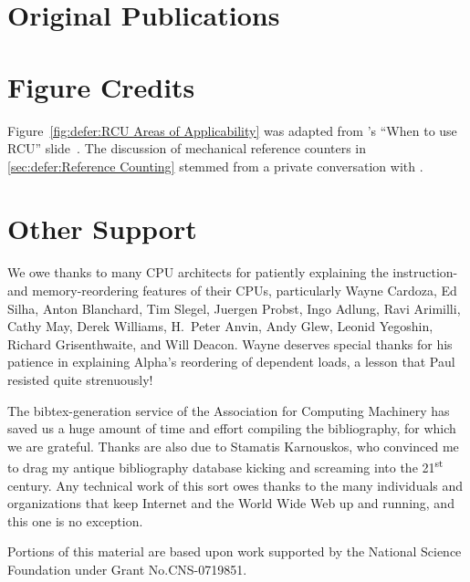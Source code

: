 \section{Original Publications}

\ListOriginalPublications

\section{Figure Credits}

\ListContributions

Figure~\ref{fig:defer:RCU Areas of Applicability} was adapted from
's ``When to use RCU'' slide~\cite{FedorPikus2017RCUthenWhat}.
The discussion of mechanical reference counters in
\cref{sec:defer:Reference Counting}
stemmed from a private conversation with .

\section{Other Support}

We owe thanks to many CPU architects for patiently explaining the
instruction- and memory-reordering features of their CPUs, particularly
Wayne Cardoza, Ed Silha, Anton Blanchard, Tim Slegel, Juergen Probst,
Ingo Adlung, Ravi Arimilli, Cathy May, Derek Williams,
H.~Peter Anvin,
Andy Glew, Leonid Yegoshin,
Richard Grisenthwaite, and Will Deacon.
Wayne deserves special thanks for his patience in explaining Alpha's reordering
of dependent loads, a lesson that Paul resisted quite strenuously!

The bibtex-generation service of the Association for Computing Machinery
has saved us a huge amount of time and effort compiling the bibliography,
for which we are grateful.
Thanks are also due to Stamatis Karnouskos, who convinced me to drag my
antique bibliography database kicking and screaming into the
21\textsuperscript{st} century.
Any technical work of this sort owes thanks to the many individuals and
organizations that keep Internet and the World Wide Web up and running,
and this one is no exception.

Portions of this material are based upon work supported by the National
Science Foundation under Grant No.\@ CNS-0719851.
